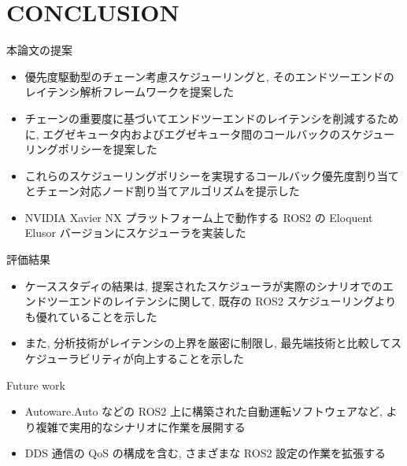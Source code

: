 
\section{CONCLUSION}
\label{sec: conslusion}

\begin{frame}{本論文の提案}
    \begin{itemize}
        \item 優先度駆動型のチェーン考慮スケジューリングと, そのエンドツーエンドのレイテンシ解析フレームワークを提案した
        \item チェーンの重要度に基づいてエンドツーエンドのレイテンシを削減するために, エグゼキュータ内およびエグゼキュータ間のコールバックのスケジューリングポリシーを提案した
        \item これらのスケジューリングポリシーを実現するコールバック優先度割り当てとチェーン対応ノード割り当てアルゴリズムを提示した
        \item NVIDIA Xavier NX プラットフォーム上で動作する ROS2 の Eloquent Elusor バージョンにスケジューラを実装した
    \end{itemize}
\end{frame}

\begin{frame}{評価結果}
    \begin{itemize}
        \item ケーススタディの結果は, 提案されたスケジューラが実際のシナリオでのエンドツーエンドのレイテンシに関して, 既存の ROS2 スケジューリングよりも優れていることを示した
        \item また, 分析技術がレイテンシの上界を厳密に制限し, 最先端技術と比較してスケジューラビリティが向上することを示した
    \end{itemize}
\end{frame}

\begin{frame}{Future work}
    \begin{itemize}
        \item Autoware.Auto などの ROS2 上に構築された自動運転ソフトウェアなど, より複雑で実用的なシナリオに作業を展開する
        \item DDS 通信の QoS の構成を含む, さまざまな ROS2 設定の作業を拡張する
    \end{itemize}
\end{frame}
